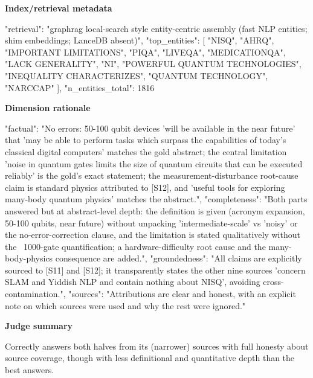 \documentclass[10pt]{article}
\begin{document}
\textbf{Index/retrieval metadata}
\begin{EvidenceText}
{
  "retrieval": "graphrag local-search style entity-centric assembly (fast NLP entities; shim embeddings; LanceDB absent)",
  "top_entities": [
    "NISQ",
    "AHRQ",
    "IMPORTANT LIMITATIONS",
    "PIQA",
    "LIVEQA",
    "MEDICATIONQA",
    "LACK GENERALITY",
    "NI",
    "POWERFUL QUANTUM TECHNOLOGIES",
    "INEQUALITY CHARACTERIZES",
    "QUANTUM TECHNOLOGY",
    "NARCCAP"
  ],
  "n_entities_total": 1816
}
\end{EvidenceText}

\textbf{Dimension rationale}
\begin{EvidenceText}
{
  "factual": "No errors: 50-100 qubit devices 'will be available in the near future' that 'may be able to perform tasks which surpass the capabilities of today's classical digital computers' matches the gold abstract; the central limitation 'noise in quantum gates limits the size of quantum circuits that can be executed reliably' is the gold's exact statement; the measurement-disturbance root-cause claim is standard physics attributed to [S12], and 'useful tools for exploring many-body quantum physics' matches the abstract.",
  "completeness": "Both parts answered but at abstract-level depth: the definition is given (acronym expansion, 50-100 qubits, near future) without unpacking 'intermediate-scale' vs 'noisy' or the no-error-correction clause, and the limitation is stated qualitatively without the ~1000-gate quantification; a hardware-difficulty root cause and the many-body-physics consequence are added.",
  "groundedness": "All claims are explicitly sourced to [S11] and [S12]; it transparently states the other nine sources 'concern SLAM and Yiddish NLP and contain nothing about NISQ', avoiding cross-contamination.",
  "sources": "Attributions are clear and honest, with an explicit note on which sources were used and why the rest were ignored."
}
\end{EvidenceText}

\textbf{Judge summary}
\begin{EvidenceText}
Correctly answers both halves from its (narrower) sources with full honesty about source coverage, though with less definitional and quantitative depth than the best answers.
\end{EvidenceText}
\end{document}
